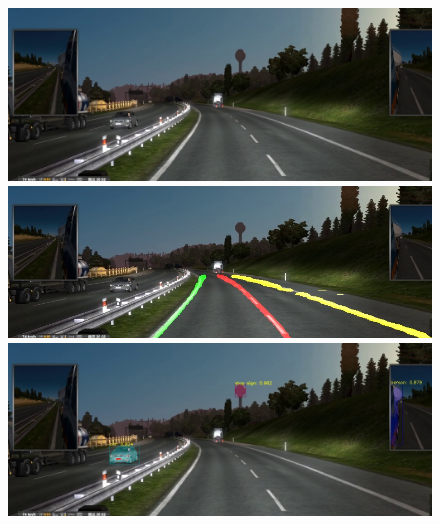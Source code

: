 \documentclass[runningheads]{llncs}
\begin{document}
\begin{figure}[!htb]
	\includegraphics[width=\linewidth]{result/w000128.jpg}
	\endminipage\hfill
	\includegraphics[width=\linewidth]{result/w000128-lane.jpg}
	\endminipage\hfill
	\includegraphics[width=\linewidth]{result/w000128-obj.jpg}
	\endminipage


\end{figure}
\end{document}
